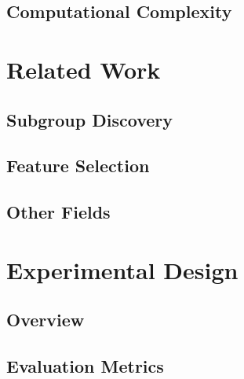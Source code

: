 \documentclass{article}
\theoremstyle{definition}
\begin{document}
\subsection{Computational Complexity}
\label{sec:osd:approach:complexity}

\section{Related Work}
\label{sec:osd:related-work}

\subsection{Subgroup Discovery}
\label{sec:osd:related-work:subgroup-discovery}

\cite{leeuwen2012diverse}
\cite{arzamasov2021reds} \cite{arzamasov2022pedagogical} \cite{vollmer2019informative}

\subsection{Feature Selection}
\label{sec:osd:related-work:feature-selection}

\cite{bach2022empirical} \cite{bach2023finding}

\subsection{Other Fields}
\label{sec:osd:related-work:other}

\cite{bailey2014alternative} \cite{grossi2017survey}
\cite{guidotti2022counterfactual}
\cite{narodytska2018learning} \cite{schidler2021sat} \cite{yu2021learning}

\section{Experimental Design}
\label{sec:osd:experimental-design}

\subsection{Overview}
\label{sec:osd:experimental-design:overview}

\subsection{Evaluation Metrics}
\label{sec:osd:experimental-design:evaluation}
\end{document}
